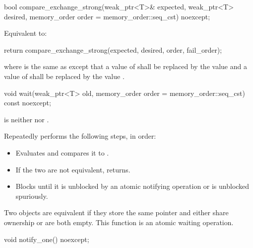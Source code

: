%
\begin{itemdecl}
bool compare_exchange_strong(weak_ptr<T>& expected, weak_ptr<T> desired,
                             memory_order order = memory_order::seq_cst) noexcept;
\end{itemdecl}

\begin{itemdescr}
\pnum
\effects
Equivalent to:
\begin{codeblock}
return compare_exchange_strong(expected, desired, order, fail_order);
\end{codeblock}
where  is the same as 
except that a value of 
shall be replaced by the value  and
a value of 
shall be replaced by the value .
\end{itemdescr}

%
\begin{itemdecl}
void wait(weak_ptr<T> old, memory_order order = memory_order::seq_cst) const noexcept;
\end{itemdecl}

\begin{itemdescr}
\pnum
\expects
{} is
neither  nor .

\pnum
\effects
Repeatedly performs the following steps, in order:
\begin{itemize}
\item
  Evaluates  and compares it to .
\item
  If the two are not equivalent, returns.
\item
  Blocks until it
  is unblocked by an atomic notifying operation or is unblocked spuriously.
\end{itemize}

\pnum
\remarks
Two  objects are equivalent
if they store the same pointer and either share ownership or are both empty.
This function is an atomic waiting operation.
\end{itemdescr}


%
\begin{itemdecl}
void notify_one() noexcept;
\end{itemdecl}

